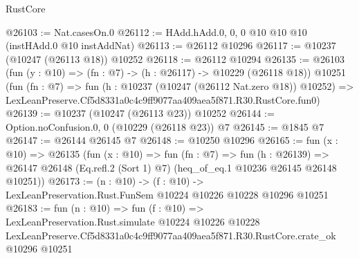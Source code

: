 \begin{lexlean}{RustCore}
\begin{coremodule}
@26103 := Nat.casesOn.{0}
@26112 := HAdd.hAdd.{0, 0, 0} @10 @10 @10 (instHAdd.{0} @10 instAddNat)
@26113 := @26112 @10296
@26117 := @10237 (@10247 (@26113 @18)) @10252
@26118 := @26112 @10294
@26135 := @26103
    (fun (y : @10) => (fn : @7) -> (h : @26117) -> @10229 (@26118 @18))
    @10251
    (fun (fn : @7) =>
    fun (h : @10237 (@10247 (@26112 Nat.zero @18)) @10252) =>
    LexLeanPreserve.Cf5d8331a0c4c9ff9077aa409aea5f871.R30.RustCore.fun0)
@26139 := @10237 (@10247 (@26113 @23)) @10252
@26144 := Option.noConfusion.{0, 0} (@10229 (@26118 @23)) @7
@26145 := @1845 @7
@26147 := @26144 @26145 @7
@26148 := @10250 @10296
@26165 := fun (x : @10) =>
  @26135
    (fun (x : @10) =>
    fun (fn : @7) =>
    fun (h : @26139) =>
    @26147 @26148 (Eq.refl.{2} (Sort 1) @7) (heq_of_eq.{1} @10236 @26145 @26148 @10251))
@26173 := (n : @10) ->
  (f : @10) -> LexLeanPreservation.Rust.FunSem @10224 @10226 @10228 @10296 @10251
@26183 := fun (n : @10) =>
  fun (f : @10) =>
  LexLeanPreservation.Rust.simulate
    @10224
    @10226
    @10228
    LexLeanPreserve.Cf5d8331a0c4c9ff9077aa409aea5f871.R30.RustCore.crate_ok
    @10296
    @10251
\end{coremodule}
\end{lexlean}
